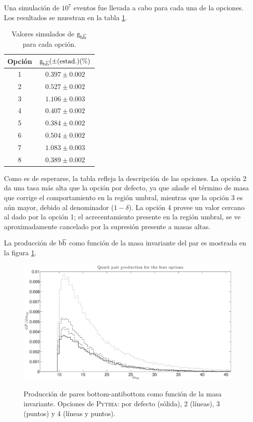 Una simulación de $10^7$ eventos fue llevada a cabo para cada una de la opciones. Los resultados se muestran en la tabla \ref{table:gbbResults}.


\begin{table}[!h]
\caption{Valores simulados de ${\mathrm g}_{{\mathrm b}\overline{\mathrm b}}$ para cada opción.}\smallskip
\label{table:gbbResults}
\centering 
\begin{tabular}{cc}
\hline \hline  
\smallskip
Opción & ${\mathrm g}_{{\mathrm b}\overline{\mathrm b}} (\pm(\text{estad.}) (\%)$ \\ 
\hline
1 &  $0.397\pm0.002$ \\
2 &  $0.527\pm0.002$ \\
3 &  $1.106\pm0.003$ \\
4 &  $0.407\pm0.002$ \\
5 &  $0.384\pm0.002$ \\
6 &  $0.504\pm0.002$ \\
7 &  $1.083\pm0.003$ \\
8 &  $0.389\pm0.002$ \\

\end{tabular}
\end{table}


Como es de esperarse, la tabla refleja la descripción de las opciones. La opción 2 da una tasa más alta que la opción por defecto, ya que añade el término de masa que corrige el comportamiento en la región umbral, mientras que la opción 3 es aún mayor, debido al denominador ($1-\delta$). La opción 4 provee un valor cercano al dado por la opción 1; el acrecentamiento presente en la región umbral, se ve aproximadamente cancelado por la supresión presente a masas altas.

La producción de ${\mathrm b}\overline{\mathrm b}$ como función de la masa invariante del par es mostrada en la figura \ref{fig:QMass}.


\begin{figure}[h]
\centering
\caption[Producción de pares de quarks bottom (cuatro opciones).]{Producción de pares bottom-antibottom como función de la masa invariante. Opciones de \textsc{Pythia}: por defecto (sólida), 2 (líneas), 3 (puntos) y 4 (líneas y puntos).}
\includegraphics[width=15cm]{QMass}
\label{fig:QMass}
\end{figure}



